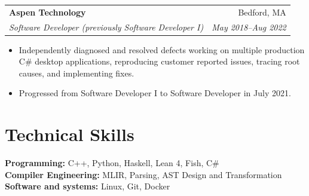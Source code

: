 \documentclass[letterpaper,11pt]{article}
\makeatletter
\newcommand{\resumeSubheading}[4]{%
  \begin{tabular*}{\textwidth}[t]{@{}l@{\extracolsep{\fill}}r@{}}
    \textbf{#1} & \small #2 \\
    \textit{\small #3} & \textit{\small #4} \\
  \end{tabular*}\vspace{0pt}
}
\newenvironment{resumeBullets}{%
  \begin{itemize}[leftmargin=0.18in, itemsep=2pt, topsep=2pt, parsep=0pt, partopsep=0pt]
  \small
}{\end{itemize}\vspace{2pt}}
\makeatother
\begin{document}
\resumeSubheading{Aspen Technology}{Bedford, MA}{Software Developer (previously Software Developer I)}{May 2018--Aug 2022}
\begin{resumeBullets}
	\item Independently diagnosed and resolved defects working on multiple production C\#
	desktop applications, reproducing customer reported issues, tracing root
	causes, and implementing fixes.
	\item Progressed from Software Developer I to Software Developer in July 2021.
\end{resumeBullets}

\section{Technical Skills}
 {\small
  \textbf{Programming:} C++, Python, Haskell, Lean 4, Fish, C\#\\[1pt]
  \textbf{Compiler Engineering:} MLIR, Parsing, AST Design and Transformation\\[2pt]
  \textbf{Software and systems:} Linux, Git, Docker
 }
\end{document}
